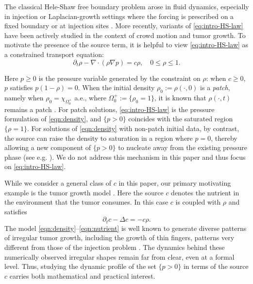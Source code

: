 \documentclass[11pt]{amsart}
\numberwithin{equation}{section}
\numberwithin{figure}{section}
\theoremstyle{plain}
\theoremstyle{definition}
\theoremstyle{remark}
\theoremstyle{plain}
\begin{document}
 The classical Hele-Shaw free boundary problem arose in fluid dynamics, especially in injection or Laplacian-growth settings where the forcing is prescribed on a fixed boundary or at injection sites \cite{SaffmanTaylor58,Richardson72,BCMP73}. More recently, variants of \eqref{eq:intro-HS-law}  have been actively studied in the context of crowd motion and tumor growth. To motivate the presence of the source term, it is helpful to view \eqref{eq:intro-HS-law}
as a constrained transport equation:
\begin{equation}\label{eqn:density}
\partial_t\rho - \nabla\cdot (\rho \nabla p) = c\rho,  \quad 0\leq \rho \leq 1.
\end{equation}

Here $p\geq 0$ is the pressure variable generated by the constraint on $\rho$: when $c\geq 0$, $p$ satisfies $p(1-\rho)=0$.  
When the initial density $\rho_0:=\rho(\cdot,0)$ is a {\it patch}, namely when $\rho_0=\chi_{\Omega_0^+}$ a.e., where $\Omega_0^+:=\{\rho_0=1\}$, it is known that $\rho(\cdot,t)$ remains a patch \cite[Theorem~1.2(c')]{JKT21}. For patch solutions, \eqref{eq:intro-HS-law} is the pressure formulation of \eqref{eqn:density}, and $\{p>0\}$ coincides with the saturated region $\{\rho=1\}$. 
For solutions of \eqref{eqn:density} with non-patch initial data, by contrast, the source can raise the density to saturation in a region where $p=0$, thereby allowing a new component of $\{p>0\}$ to nucleate away from the existing pressure phase (see e.g. \cite{MPQ17}). We do not address this mechanism in this paper and thus focus on \eqref{eq:intro-HS-law}.


While we consider a general class of $c$ in this paper, our primary motivating example is  the tumor growth model \cite{PQV14,DavidPerthame,JKT23,CJK25}. Here the source $c$ denotes the nutrient in the environment that the tumor consumes. In this case $c$ is coupled with $\rho$ and satisfies
\begin{equation}\label{eqn:nutrient}
\partial_t c - \Delta c = -c\rho.
\end{equation}
The model \eqref{eqn:density}--\eqref{eqn:nutrient} is well known to generate diverse patterns of irregular tumor growth, including the growth of thin fingers, patterns very different from those of the injection problem \cite{CLN03,MRCSdendritic,FTXZ23}.
The dynamics behind these numerically observed irregular shapes remain far from clear, even at a formal level. Thus, studying the dynamic profile of the set $\{p>0\}$ in terms of the source $c$  carries both mathematical and practical interest.
\end{document}

